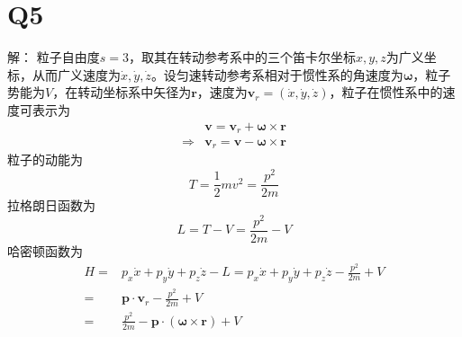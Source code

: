 \documentclass[10pt,a4paper]{article}
\begin{document}
\section*{Q5}解：
粒子自由度$s=3$，取其在转动参考系中的三个笛卡尔坐标$x,y,z$为广义坐标，从而广义速度为$\dot{x},\dot{y},\dot{z}$。设匀速转动参考系相对于惯性系的角速度为$\bm{\omega}$，粒子势能为$V$，在转动坐标系中矢径为$\bm{r}$，速度为$\bm{v}_r=(\dot{x},\dot{y},\dot{z})$，粒子在惯性系中的速度可表示为
\begin{align*}
&\bm{v}=\bm{v}_r+\bm{\omega}\times\bm{r}\\
\Longrightarrow&\bm{v}_r=\bm{v}-\bm{\omega}\times\bm{r}
\end{align*}
粒子的动能为
\[
T=\frac{1}{2}mv^2=\frac{p^2}{2m}
\]
拉格朗日函数为
\[
L=T-V=\frac{p^2}{2m}-V
\]
哈密顿函数为
\begin{align*}
H=&p_x\dot{x}+p_y\dot{y}+p_z\dot{z}-L=p_x\dot{x}+p_y\dot{y}+p_z\dot{z}-\frac{p^2}{2m}+V\\
=&\bm{p}\cdot\bm{v}_r-\frac{p^2}{2m}+V\\
=&\frac{p^2}{2m}-\bm{p}\cdot(\bm{\omega}\times\bm{r})+V
\end{align*}
\end{document}

